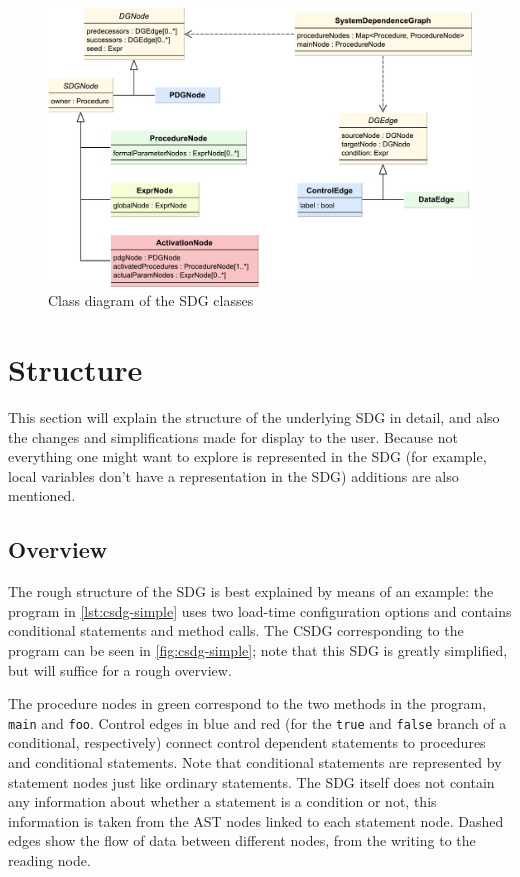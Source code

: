 \begin{figure}[hpb]
  \centering
    \includegraphics[width=\textwidth]{bilder/classes-sdg}
  \caption{Class diagram of the SDG classes}
  \label{fig:classes-sdg}
\end{figure}


\section{Structure}

This section will explain the structure of the underlying SDG in detail, and also the changes and simplifications made 
for display to the user. Because not everything one might want to explore is represented in the SDG (for example, local 
variables don't have a representation in the SDG) additions are also mentioned.


\subsection{Overview}

The rough structure of the SDG is best explained by means of an example: the program in \autoref{lst:csdg-simple} uses 
two load-time configuration options and contains conditional statements and method calls. The CSDG corresponding to the 
program can be seen in \autoref{fig:csdg-simple}; note that this SDG is greatly simplified, but will suffice for a 
rough overview.

The procedure nodes in green correspond to the two methods in the program, \lstinline|main| and \lstinline|foo|. 
Control edges in blue and red (for the \lstinline|true| and \lstinline|false| branch of a conditional, respectively) 
connect control dependent statements to procedures and conditional statements. Note that conditional statements are 
represented by statement nodes just like ordinary statements. The SDG itself does not contain any information about 
whether a statement is a condition or not, this information is taken from the AST nodes linked to each statement node. 
Dashed edges show the flow of data between different nodes, from the writing to the reading node.

